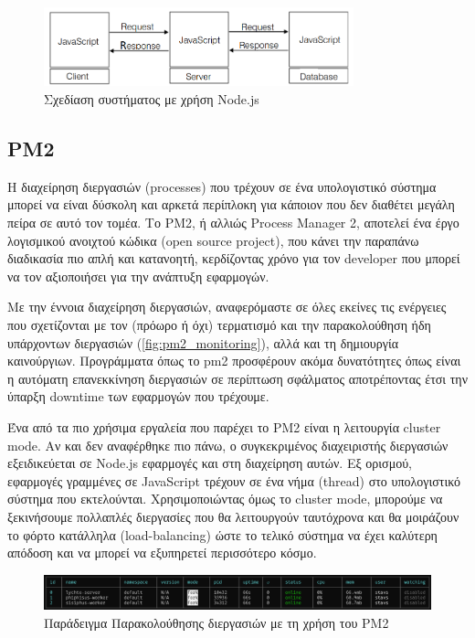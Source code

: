 \begin{figure}[!ht]
	\centering
	\includegraphics[width=0.8\textwidth]{./images/chapter2/javascript_end_to_end.png}
	\caption[Σχεδίαση συστήματος με χρήση Node.js]{Σχεδίαση συστήματος με χρήση Node.js \cite{nodejs_challenges_in_implementation}}
	\label{fig:nodejs_system}
\end{figure}

\subsection{PM2}
\label{subsec:pm2}

Η διαχείρηση διεργασιών (processes) που τρέχουν σε ένα υπολογιστικό σύστημα μπορεί να είναι δύσκολη
και αρκετά περίπλοκη για κάποιον που δεν διαθέτει μεγάλη πείρα σε αυτό τον τομέα. Το PM2, ή αλλιώς Process Manager 2,
αποτελεί ένα έργο λογισμικού ανοιχτού κώδικα (open source project), που κάνει την παραπάνω διαδικασία πιο απλή και κατανοητή, κερδίζοντας χρόνο
για τον developer που μπορεί να τον αξιοποιήσει για την ανάπτυξη εφαρμογών.

Με την έννοια διαχείρηση διεργασιών, αναφερόμαστε σε όλες εκείνες τις ενέργειες που σχετίζονται
με τον (πρόωρο ή όχι) τερματισμό και την παρακολούθηση ήδη υπάρχοντων διεργασιών (\autoref{fig:pm2_monitoring}), αλλά και τη δημιουργία καινούργιων.
Προγράμματα όπως το pm2 προσφέρουν ακόμα δυνατότητες όπως είναι η αυτόματη επανεκκίνηση διεργασιών σε περίπτωση σφάλματος
αποτρέποντας έτσι την ύπαρξη downtime των εφαρμογών που τρέχουμε.

Ένα από τα πιο χρήσιμα εργαλεία που παρέχει το PM2 είναι η λειτουργία cluster mode.
Αν και δεν αναφέρθηκε πιο πάνω, ο συγκεκριμένος διαχειριστής διεργασιών εξειδικεύεται σε Node.js
εφαρμογές και στη διαχείρηση αυτών. Εξ ορισμού, εφαρμογές γραμμένες σε JavaScript τρέχουν σε ένα νήμα (thread)
στο υπολογιστικό σύστημα που εκτελούνται. Χρησιμοποιώντας όμως το cluster mode, μπορούμε να
ξεκινήσουμε πολλαπλές διεργασίες που θα λειτουργούν ταυτόχρονα και θα μοιράζουν το φόρτο
κατάλληλα (load-balancing) ώστε το τελικό σύστημα να έχει καλύτερη απόδοση και να μπορεί να εξυπηρετεί 
περισσότερο κόσμο. 

\begin{figure}[!ht]
	\centering
	\includegraphics[width=1\textwidth]{./images/chapter2/pm2_monitoring.png}
	\caption[Παράδειγμα Παρακολούθησης διεργασιών με τη χρήση του PM2]{Παράδειγμα Παρακολούθησης διεργασιών με τη χρήση του PM2}
	\label{fig:pm2_monitoring}
\end{figure}

